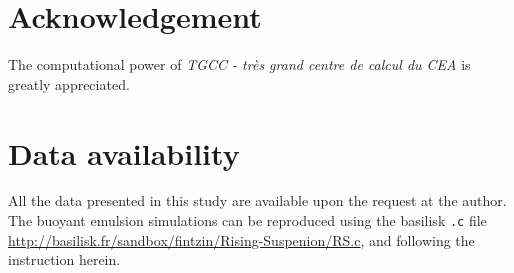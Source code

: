 \section*{Acknowledgement}

The computational power of  \textit{TGCC - tr\`es grand centre de calcul du CEA} is greatly appreciated. 
\section*{Data availability}

All the data presented in this study are available upon the request at the author. 
The buoyant emulsion simulations can be reproduced using the basilisk \texttt{.c} file \url{http://basilisk.fr/sandbox/fintzin/Rising-Suspenion/RS.c}, and following the instruction herein. 

